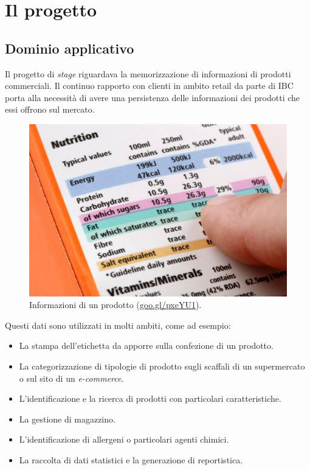 \section{Il progetto}

	\subsection{Dominio applicativo}
		Il progetto di \textit{stage} riguardava la memorizzazione di informazioni di prodotti commerciali. Il continuo rapporto con clienti in ambito \gls{retail} da parte di IBC porta alla necessità di avere una persistenza delle informazioni dei prodotti che essi offrono sul mercato. 
		
		\begin{figure}[H]
			\centering
			\includegraphics[scale=0.5]{immagini/etichetta}
			\caption{Informazioni di un prodotto (\url{goo.gl/pxeYU1}).}
		\end{figure}
		
		Questi dati sono utilizzati in molti ambiti, come ad esempio:
		\begin{itemize}
			\item La stampa dell'etichetta da apporre sulla confezione di un prodotto.
			\item La categorizzazione di tipologie di prodotto sugli scaffali di un supermercato o sul sito di un \textit{e-commerce}.
			\item L'identificazione e la ricerca di prodotti con particolari caratteristiche.
			\item La gestione di magazzino.
			\item L'identificazione di allergeni o particolari agenti chimici.
			\item La raccolta di dati statistici e la generazione di reportistica.
		\end{itemize}
		
